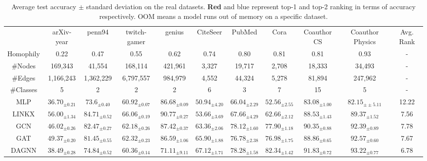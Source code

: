 \documentclass{article}
\theoremstyle{plain}
\begin{document}
\begin{table*}[htb]
\centering
\caption{Average test accuracy $\pm$ standard deviation on the real datasets. 
{\color{red} \textbf{Red}} and {\color{blue} blue} represent top-1 and top-2 ranking in terms of accuracy respectively. OOM means a model runs out of memory on a specific dataset.}
\label{tab:real-results}
\scriptsize
\tabcolsep=0.01cm
\begin{tabular}{c|ccccccccc|c}
\toprule
      & arXiv-year       & penn94       & twitch-gamer     & genius       & CiteSeer     & PubMed       & Cora     & Coauthor CS      & Coauthor Physics     & Avg. Rank \\
Homophily & 0.22     & 0.47     & 0.55     & 0.62     & 0.74     & 0.80     & 0.81     & 0.81     & 0.93     & -      \\
\#Nodes   & 169,343      & 41,554       & 168,114      & 421,961      & 3,327    & 19,717       & 2,708    & 18,333       & 34,493       & -      \\
\#Edges   & 1,166,243    & 1,362,229    & 6,797,557    & 984,979      & 4,552    & 44,324       & 5,278    & 81,894       & 247,962      & -      \\
\#Classes & 5    & 2    & 2    & 2    & 6    & 3    & 7    & 15       & 5    & -      \\
\midrule
\midrule
MLP       & $36.70_{\pm 0.21}$   & $73.6_{\pm 0.40}$     & $60.92_{\pm 0.07}$   & $86.68_{\pm 0.09}$     & $50.94_{\pm 4.20}$   & $66.04_{\pm2.29}$    & $52.56_{\pm2.55}$  & $83.08_{\pm1.00}$    & $82.15_{\pm±5.11}$       &  12.22      \\
LINKX     & {\color[HTML]{0000FF} $56.00_{\pm 1.34}$} & $84.71_{\pm 0.52}$ & $66.06_{\pm 0.19}$ & {\color[HTML]{0000FF} $90.77_{\pm 0.27}$} & $53.66_{\pm 3.69}$    & $67.66_{\pm 4.29}$    & $62.66_{\pm 2.12}$    & $88.53_{\pm 1.43}$    & $89.37_{\pm 1.52}$    &   7.56     \\
\midrule
GCN       & $46.02_{\pm 0.26}$    & $82.47_{\pm 0.27}$    & $62.18_{\pm 0.26}$    & $87.42_{\pm 0.37}$    & $63.36_{\pm 2.06}$    & $78.12_{\pm 1.60}$    & $77.90_{\pm 1.18}$    & $90.35_{\pm 0.88}$    & $92.39_{\pm 0.89}$    &   7.78     \\
GAT       & $49.37_{\pm 0.20}$    & $81.45_{\pm 0.55}$    & $62.32_{\pm 0.23}$    & $86.59_{\pm 1.06}$    & $65.90_{\pm 1.88}$    & $76.78_{\pm 2.38}$    & $76.98_{\pm 1.75}$    & $88.86_{\pm 0.65}$    & $92.57_{\pm 0.60}$    &    7.67    \\ \midrule
DAGNN     & $38.49_{\pm 0.28}$    & $74.84_{\pm 0.52}$    & $60.36_{\pm 0.14}$    & $71.11_{\pm 9.11}$    & {\color[HTML]{0000FF} $67.12_{\pm 1.71}$} & $78.28_{\pm 1.58}$ & {\color[HTML]{0000FF} $82.34_{\pm 1.42}$} & {\color[HTML]{0000FF} $91.83_{\pm 0.72}$} & $93.22_{\pm 0.77}$    &  6.78     \\

\end{tabular}
\end{table*}
\end{document}
